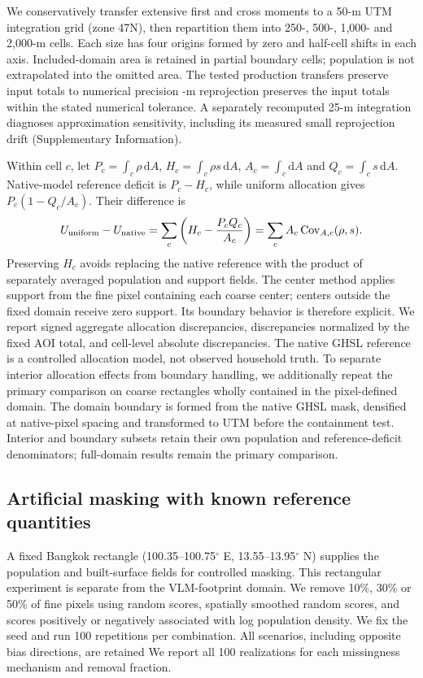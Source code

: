 \documentclass[pdflatex,sn-nature]{sn-jnl}
\providecommand{\DIFadd}[1]{{\protect\color{blue} \sf #1}} %
\providecommand{\DIFdel}[1]{{\protect\color{red} \scriptsize #1}} %
\providecommand{\DIFaddbegin}{} %
\providecommand{\DIFaddend}{} %
\providecommand{\DIFdelbegin}{} %
\providecommand{\DIFdelend}{} %
\begin{document}
We conservatively transfer extensive first and cross moments to a 50-m UTM integration grid (zone 47N), then repartition them into 250-, 500-, 1,000- and 2,000-m cells. Each size has four origins formed by zero and half-cell shifts in each axis. Included-domain area is retained in partial boundary cells; population is not extrapolated into the omitted area. The \DIFdelbegin \DIFdel{tested production transfers preserve input totals to numerical precision}\DIFdelend \DIFaddbegin \DIFadd{50-m reprojection preserves the input totals within the stated numerical tolerance}\DIFaddend . A separately recomputed 25-m integration diagnoses approximation sensitivity, including its measured small reprojection drift (Supplementary Information).

Within cell $c$, let $P_c=\int_c\rho\,\mathrm{d}A$, $H_c=\int_c\rho s\,\mathrm{d}A$, $A_c=\int_c\mathrm{d}A$ and $Q_c=\int_c s\,\mathrm{d}A$. Native-model reference deficit is $P_c-H_c$, while uniform allocation gives $P_c(1-Q_c/A_c)$. Their difference is
\begin{equation}
U_{\rm uniform}-U_{\rm native}
=\sum_c\left(H_c-\frac{P_c Q_c}{A_c}\right)
=\sum_c A_c\operatorname{Cov}_{A,c}(\rho,s).
\label{eq:covariance}
\end{equation}
Preserving $H_c$ avoids replacing the native reference with the product of separately averaged population and support fields. The center method applies support from the fine pixel containing each coarse center; centers outside the fixed domain receive zero support. \DIFdelbegin \DIFdel{Its boundary behavior is therefore explicit. }\DIFdelend We report signed aggregate allocation discrepancies, discrepancies normalized by the fixed AOI total, and cell-level absolute discrepancies. The native GHSL reference is a controlled allocation model, not observed household truth. To separate interior allocation effects from boundary handling, we additionally repeat the primary comparison on coarse rectangles wholly contained in the pixel-defined domain. The domain boundary is formed from the native GHSL mask, densified at native-pixel spacing and transformed to UTM before the containment test. Interior and boundary subsets retain their own population and reference-deficit denominators; full-domain results remain the primary comparison.

\subsection{Artificial masking with known reference quantities}
A fixed Bangkok rectangle (100.35--100.75$^\circ$ E, 13.55--13.95$^\circ$ N) supplies the population and built-surface fields for controlled masking. This rectangular experiment is separate from the VLM-footprint domain. We remove 10\%, 30\% or 50\% of fine pixels using random scores, spatially smoothed random scores, and scores positively or negatively associated with log population density. We fix the seed and run 100 repetitions per combination. \DIFdelbegin \DIFdel{All scenarios, including opposite bias directions, are retained}\DIFdelend \DIFaddbegin \DIFadd{We report all 100 realizations for each missingness mechanism and removal fraction}\DIFaddend .
\end{document}
